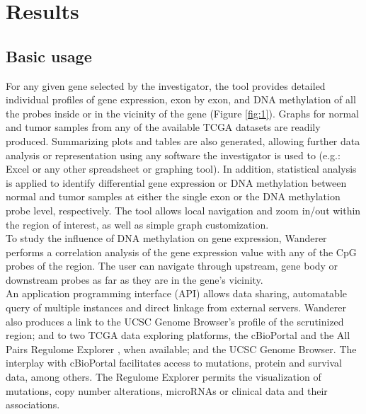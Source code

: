 \documentclass{bmcart}
\begin{document}
\section*{Results}

\subsection*{Basic usage}


For any given gene selected by the investigator, the tool provides detailed individual profiles of gene expression, exon by exon, and DNA methylation of all the probes inside or in the vicinity of the gene (Figure \ref{fig:1}). Graphs for normal and tumor samples from any of the available TCGA datasets are readily produced. Summarizing plots and tables are also generated, allowing further data analysis or representation using any software the investigator is used to (e.g.: Excel or any other spreadsheet or graphing tool). In addition, statistical analysis is applied to identify differential gene expression or DNA methylation between normal and tumor samples at either the single exon or the DNA methylation probe level, respectively. The tool allows local navigation and zoom in/out within the region of interest, as well as simple graph customization.\\ 

{\color{red}
To study the influence of DNA methylation on gene expression, Wanderer performs a correlation analysis of the gene expression value with any of the CpG probes of the region. The user can navigate through upstream, gene body or downstream probes as far as they are in the gene's vicinity.}\\


{\color{red}
An application programming interface (API) allows data sharing, automatable query of multiple instances and direct linkage from external servers. Wanderer also produces a link to the UCSC Genome Browser's profile of the scrutinized region; and to two TCGA data exploring platforms, the cBioPortal \cite{gao2013integrative} and the All Pairs Regulome Explorer \cite{cancer2012comprehensive}, when available; {\color{red} and the UCSC Genome Browser}. The interplay with cBioPortal facilitates access to mutations, protein and survival data, among others. The Regulome Explorer permits the visualization of mutations, copy number alterations, microRNAs or clinical data and their associations.}
\end{document}
